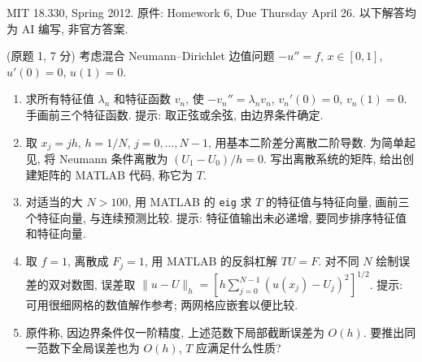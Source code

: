 MIT 18.330, Spring 2012. 原件: Homework 6, Due Thursday April 26. 以下解答均为 AI 编写, 非官方答案.

\begin{exercise}\label{ps6-q1}
(原题 1, 7 分) 考虑混合 Neumann--Dirichlet 边值问题
$-u''=f$, $x\in[0,1]$, $u'(0)=0$, $u(1)=0$.
\begin{enumerate}[label=(\alph*)]
\item 求所有特征值 $\lambda_n$ 和特征函数 $v_n$, 使
$-v_n''=\lambda_nv_n$, $v_n'(0)=0$, $v_n(1)=0$.
手画前三个特征函数. 提示: 取正弦或余弦, 由边界条件确定.
\item 取 $x_j=jh$, $h=1/N$, $j=0,\ldots,N-1$, 用基本二阶差分离散二阶导数. 为简单起见, 将 Neumann 条件离散为 $(U_1-U_0)/h=0$.
写出离散系统的矩阵, 给出创建矩阵的 MATLAB 代码, 称它为 $T$.
\item 对适当的大 $N>100$, 用 MATLAB 的 \texttt{eig} 求 $T$ 的特征值与特征向量, 画前三个特征向量, 与连续预测比较. 提示: 特征值输出未必递增, 要同步排序特征值和特征向量.
\item 取 $f=1$, 离散成 $F_j=1$, 用 MATLAB 的反斜杠解 $TU=F$. 对不同 $N$ 绘制误差的双对数图, 误差取
$\|u-U\|_h=[h\sum_{j=0}^{N-1}(u(x_j)-U_j)^2]^{1/2}$.
提示: 可用很细网格的数值解作参考; 两网格应嵌套以便比较.
\item 原件称, 因边界条件仅一阶精度, 上述范数下局部截断误差为 $O(h)$. 要推出同一范数下全局误差也为 $O(h)$, $T$ 应满足什么性质?
\end{enumerate}
\end{exercise}
